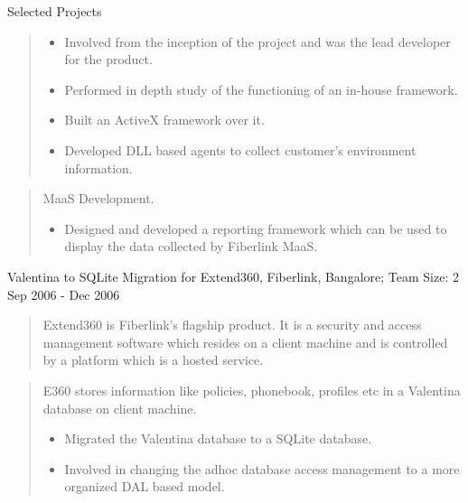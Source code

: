 \documentclass{resume}
\newcommand{\teamsize}{\sc\footnotesize Team Size: }
\begin{document}
\begin{category}{Selected Projects}{}
\begin{quote}
            \begin{itemize}
                \item Involved from the inception of the project and was the
                    lead developer for the product.
                \item Performed in depth study of the functioning of an
                    in-house framework.
                \item Built an ActiveX framework over it.
                \item Developed DLL based agents to collect customer’s
                    environment information.
            \end{itemize}
        \end{quote}
        \begin{quote}
            MaaS Development.
            \begin{itemize}
                \item Designed and developed a reporting framework which can be
                    used to display the data collected by Fiberlink MaaS.
            \end{itemize}
        \end{quote}

    \pagebreak

    \item {\topic Valentina to SQLite Migration for Extend360,} Fiberlink,
        Bangalore;
        {\teamsize 2}
        {\period Sep 2006 - Dec 2006}
        \begin{quote}
            Extend360 is Fiberlink’s flagship product. It is a security and
            access management software which resides on a client machine and is
            controlled by a platform which is a hosted service.
        \end{quote}
        \begin{quote}
            E360 stores information like policies, phonebook, profiles etc in a
            Valentina database on client machine.
            \begin{itemize}
                \item Migrated the Valentina database to a SQLite database.
                \item Involved in changing the adhoc database access management
                    to a more organized DAL based model.
            \end{itemize}
        \end{quote}


\end{category}
\end{document}
